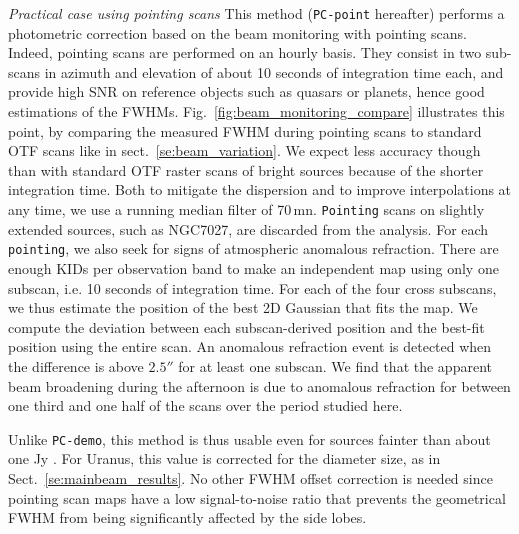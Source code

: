 \noindent \emph{Practical case using pointing scans} This method ({\tt PC-point}
hereafter) performs a photometric correction based on the beam monitoring with
pointing scans. Indeed, pointing scans are performed on an hourly basis. They
consist in two sub-scans in azimuth and elevation of about 10 seconds of
integration time each, and provide high SNR on reference objects such as quasars
or planets, hence good estimations of the
FWHMs. Fig.~\ref{fig:beam_monitoring_compare} illustrates this point, by
comparing the measured FWHM during pointing scans to standard OTF scans like in
sect.~\ref{se:beam_variation}. We expect less accuracy though than with standard
OTF raster scans of bright sources because of the shorter integration time. Both
to mitigate the dispersion and to improve interpolations at any time, we use a
running median filter of 70\,mn. {\tt Pointing} scans on {\lp slightly extended}
sources, such as NGC7027, are discarded from the analysis. For each {\tt
  pointing}, we also seek for signs of atmospheric anomalous refraction. There
are enough KIDs per observation band to make an independent map using only one
subscan, i.e. 10 seconds of integration time.  For each of the four cross
subscans, we thus estimate the position of the best 2D Gaussian that fits the
map. We compute the deviation between each subscan-derived position and the
best-fit position using the entire scan. An anomalous refraction event is
detected when the difference is above $2.5''$ for at least one subscan. We find
that the apparent beam broadening during the afternoon is due to anomalous
refraction for between one third and one half of the scans over the period
studied here.

Unlike {\tt PC-demo}, this method is thus usable even for sources fainter than
about one Jy . For Uranus, this value is corrected for the diameter size, as in
Sect.~\ref{se:mainbeam_results}. No other FWHM offset correction is needed since
pointing scan maps have a low signal-to-noise ratio that prevents the
geometrical FWHM from being significantly affected by the side lobes.


